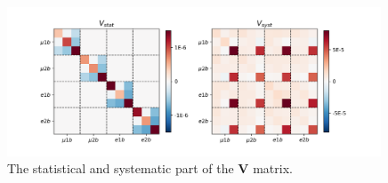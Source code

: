\begin{figure}[ht]
    \centering
    \includegraphics[width=0.99\textwidth]{chapters/Analysis/sectionSystematics/figures/covarMatrix_total.png}
    \caption{ The statistical and systematic part of the $\textbf{V}$ matrix. }
    \label{fig:corBetaBar}
\end{figure}



\FloatBarrier










